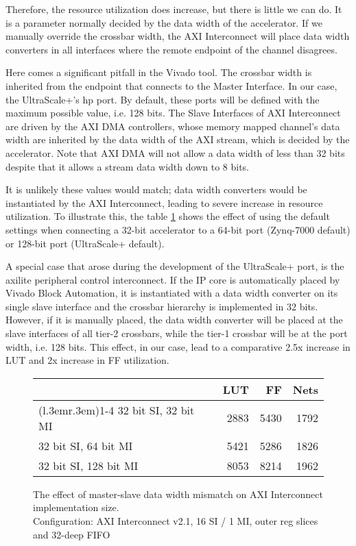 Therefore, the resource utilization does increase, but there is little we can do.
It is a parameter normally decided by the data width of the accelerator.
If we manually override the crossbar width, the AXI Interconnect will place
data width converters in all interfaces where the remote endpoint of the channel disagrees.

Here comes a significant pitfall in the Vivado tool. The crossbar width is inherited
from the endpoint that connects to the Master Interface. In our case, the UltraScale+'s \gls{hp} port.
By default, these ports will be defined with the maximum possible value, i.e. 128 bits.
The Slave Interfaces of AXI Interconnect are driven by the AXI DMA controllers,
whose memory mapped channel's data width are inherited by the data width of the AXI stream,
which is decided by the accelerator. Note that AXI DMA will not allow a data width of less
than 32 bits despite that it allows a stream data width down to 8 bits.

It is unlikely these values would match; data width converters would be instantiated by
the AXI Interconnect, leading to severe increase in resource utilization.
To illustrate this, the table \ref{tab:int-dw} shows the effect of using the default
settings when connecting a 32-bit accelerator to a 64-bit port (Zynq-7000 default)
or 128-bit port (UltraScale+ default).

A special case that arose during the development of the UltraScale+ port,
is the \gls{axilite} peripheral control interconnect.
If the IP core is automatically placed by Vivado Block Automation,
it is instantiated with a data width converter on its single slave interface
and the crossbar hierarchy is implemented in 32 bits.
However, if it is manually placed, the data width converter will be placed
at the slave interfaces of all tier-2 crossbars, while the tier-1 crossbar will be
at the port width, i.e. 128 bits.
This effect, in our case, lead to a comparative 2.5x increase in LUT and 2x increase in FF utilization.


\begin{figure}[ht!]
\centering
\begin{tabular}{lrrr}
\toprule
			& LUT	& FF	& Nets \\
\cmidrule(l{.3em}r{.3em}){1-4}
32 bit SI, 32 bit MI	& 2883 & 5430 & 1792 \\
32 bit SI, 64 bit MI	& 5421	&5286	&1826	\\
32 bit SI, 128 bit MI	& 8053	&8214	&1962	\\
\bottomrule
\end{tabular}
\caption{The effect of master-slave data width mismatch on AXI Interconnect implementation size.\\
	Configuration: AXI Interconnect v2.1, 16 SI / 1 MI, outer reg slices and 32-deep FIFO}
\label{tab:int-dw}
\end{figure}

